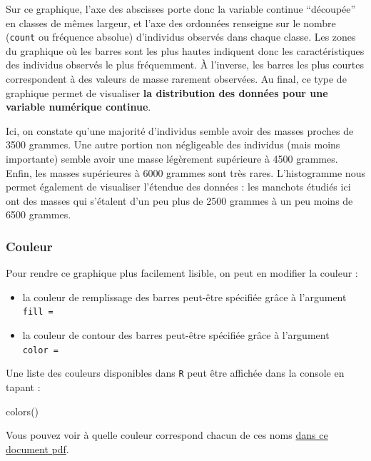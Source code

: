 \documentclass[
  letterpaper,
  DIV=11,
  numbers=noendperiod]{scrreprt}
\newenvironment{Shaded}{\begin{snugshade}}{\end{snugshade}}
\newcommand{\FunctionTok}[1]{\textcolor[rgb]{0.28,0.35,0.67}{#1}}
\newcommand{\NormalTok}[1]{\textcolor[rgb]{0.00,0.23,0.31}{#1}}
\providecommand{\tightlist}{%
  \setlength{\itemsep}{0pt}\setlength{\parskip}{0pt}}\usepackage{longtable,booktabs,array}
\begin{document}
Sur ce graphique, l'axe des abscisses porte donc la variable continue
``découpée'' en classes de mêmes largeur, et l'axe des ordonnées
renseigne sur le nombre (\texttt{count} ou fréquence absolue)
d'individus observés dans chaque classe. Les zones du graphique où les
barres sont les plus hautes indiquent donc les caractéristiques des
individus observés le plus fréquemment. À l'inverse, les barres les plus
courtes correspondent à des valeurs de masse rarement observées. Au
final, ce type de graphique permet de visualiser \textbf{la distribution
des données pour une variable numérique continue}.

Ici, on constate qu'une majorité d'individus semble avoir des masses
proches de 3500 grammes. Une autre portion non négligeable des individus
(mais moins importante) semble avoir une masse légèrement supérieure à
4500 grammes. Enfin, les masses supérieures à 6000 grammes sont très
rares. L'histogramme nous permet également de visualiser l'étendue des
données : les manchots étudiés ici ont des masses qui s'étalent d'un peu
plus de 2500 grammes à un peu moins de 6500 grammes.

\hypertarget{couleur}{%
\subsubsection{Couleur}\label{couleur}}

Pour rendre ce graphique plus facilement lisible, on peut en modifier la
couleur :

\begin{itemize}
\tightlist
\item
  la couleur de remplissage des barres peut-être spécifiée grâce à
  l'argument \texttt{fill\ =}
\item
  la couleur de contour des barres peut-être spécifiée grâce à
  l'argument \texttt{color\ =}
\end{itemize}

Une liste des couleurs disponibles dans \texttt{R} peut être affichée
dans la console en tapant :

\begin{Shaded}
\begin{Highlighting}[]
\FunctionTok{colors}\NormalTok{()}
\end{Highlighting}
\end{Shaded}

Vous pouvez voir à quelle couleur correspond chacun de ces noms
\href{http://www.stat.columbia.edu/~tzheng/files/Rcolor.pdf}{dans ce
document pdf}.
\end{document}
